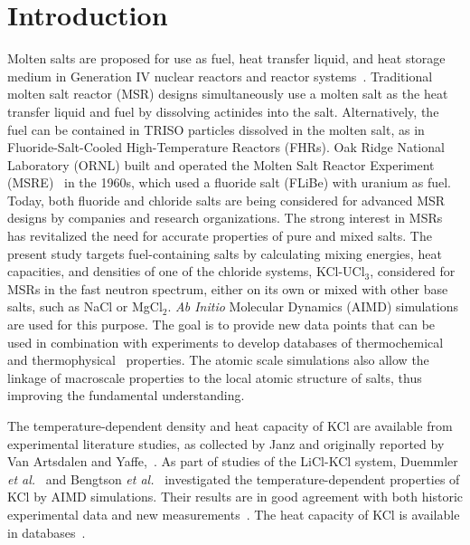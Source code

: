 \documentclass[preprint,3p,10pt,twocolumn,number,sort&compress]{elsarticle}
\begin{document}

\section{Introduction}
\label{sec:intro}
Molten salts are proposed for use as fuel, heat transfer liquid, and heat storage medium in Generation IV nuclear reactors and reactor systems~\cite{SERP2014308}. Traditional molten salt reactor (MSR) designs simultaneously use a molten salt as the heat transfer liquid and fuel by dissolving actinides into the salt. Alternatively, the fuel can be contained in TRISO particles dissolved in the molten salt, as in Fluoride-Salt-Cooled High-Temperature Reactors (FHRs).  
Oak Ridge National Laboratory (ORNL) built and operated the Molten Salt Reactor Experiment (MSRE)~\cite{MSRE1,MSRE2} in the 1960s, which used a fluoride salt (FLiBe) with uranium as fuel. 
Today, both fluoride and chloride salts are being considered for advanced MSR designs by companies and research organizations. 
The strong interest in MSRs has revitalized the need for accurate properties of pure and mixed salts. The present study targets fuel-containing salts by calculating mixing energies, heat capacities, and densities of one of the chloride systems, KCl-UCl$_3$, considered for MSRs in the fast neutron spectrum, either on its own or mixed with other base salts, such as NaCl or MgCl$_2$. \textit{Ab Initio} Molecular Dynamics (AIMD) simulations are used for this purpose. 
The goal is to provide new data points that can be used in combination with experiments to develop databases of thermochemical~\cite{ARD2022153631} and thermophysical~\cite{BIRRI2022117954} properties. The atomic scale simulations also allow the linkage of macroscale properties to the local atomic structure of salts, thus improving the fundamental understanding.   

The temperature-dependent density and heat capacity of KCl are available from experimental literature studies, as collected by Janz \cite{Janz1988} and originally reported by Van Artsdalen and Yaffe,~\cite{Artsdalen1955}.  
As part of studies of the LiCl-KCl system, Duemmler \textit{et al.}~\cite{DUEMMLER2022153414} and Bengtson \textit{et al.}~\cite{BENGTSON2014362} investigated the temperature-dependent properties of KCl by AIMD simulations. 
Their results are in good agreement with both historic experimental data and new measurements~\cite{Artsdalen1955,DUEMMLER2022153414}. The heat capacity of KCl is available in databases~\cite{NIST,219851}. 
\end{document}
